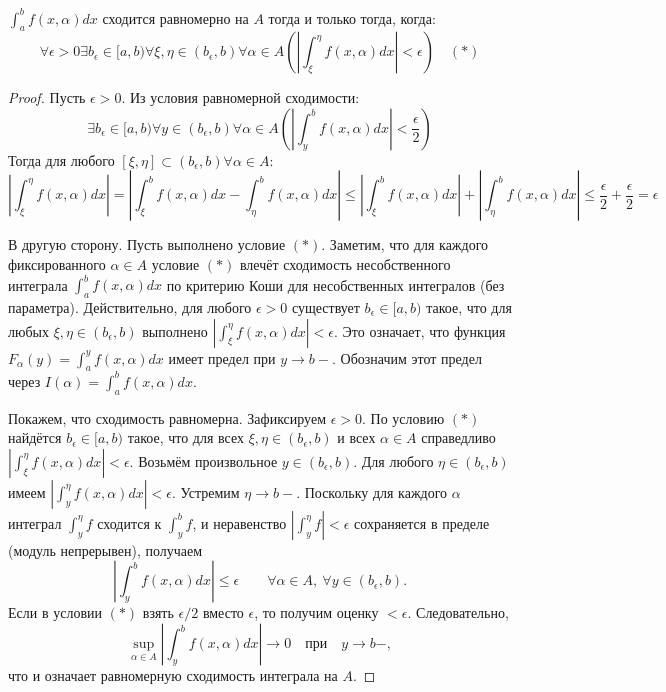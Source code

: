 \begin{theorem}
    \(\int_a^b f(x, \alpha)dx\) сходится равномерно на \(A\) тогда и только тогда, когда:
    \[\forall \epsilon > 0 \exists b_{\epsilon} \in [a, b) \forall \xi, \eta \in (b_\epsilon, b) \forall \alpha \in A \left( \left| \int_\xi^\eta f(x, \alpha) dx \right| < \epsilon \right)\quad(*)\]
\end{theorem}
\begin{proof}
    Пусть \(\epsilon > 0\). Из условия равномерной сходимости:
    \[\exists b_\epsilon \in [a, b)  \forall y \in (b_\epsilon, b) \forall \alpha \in A \left( \left| \int_y^b f(x, \alpha) dx \right| < \frac{\epsilon}{2} \right)\]
    Тогда для любого \([\xi, \eta] \subset (b_\epsilon, b) \forall \alpha \in A\):
    \[\left| \int_\xi^\eta f(x, \alpha) dx \right| = \left| \int_\xi^b f(x, \alpha) dx - \int_\eta^b f(x, \alpha) dx \right| \le \left| \int_\xi^b f(x, \alpha) dx \right| + \left|\int_\eta^b f(x, \alpha) dx \right| \le \frac{\epsilon}{2} + \frac{\epsilon}{2} = \epsilon\]

    В другую сторону. Пусть выполнено условие \((*)\). Заметим, что для каждого фиксированного \(\alpha \in A\) условие \((*)\) влечёт сходимость несобственного интеграла \(\int_a^b f(x,\alpha)dx\) по критерию Коши для несобственных интегралов (без параметра). Действительно, для любого \(\epsilon>0\) существует \(b_\epsilon\in[a,b)\) такое, что для любых \(\xi,\eta\in(b_\epsilon,b)\) выполнено \(\left|\int_\xi^\eta f(x,\alpha)dx\right|<\epsilon\). Это означает, что функция \(F_\alpha(y)=\int_a^y f(x,\alpha)dx\) имеет предел при \(y\to b-\). Обозначим этот предел через \(I(\alpha)=\int_a^b f(x,\alpha)dx\).

    Покажем, что сходимость равномерна. Зафиксируем \(\epsilon>0\). По условию \((*)\) найдётся \(b_\epsilon\in[a,b)\) такое, что для всех \(\xi,\eta\in(b_\epsilon,b)\) и всех \(\alpha\in A\) справедливо \(\left|\int_\xi^\eta f(x,\alpha)dx\right|<\epsilon\). Возьмём произвольное \(y\in(b_\epsilon,b)\). Для любого \(\eta\in(b_\epsilon,b)\) имеем \(\left|\int_y^\eta f(x,\alpha)dx\right|<\epsilon\). Устремим \(\eta\to b-\). Поскольку для каждого \(\alpha\) интеграл \(\int_y^\eta f\) сходится к \(\int_y^b f\), и неравенство \(\left|\int_y^\eta f\right|<\epsilon\) сохраняется в пределе (модуль непрерывен), получаем
    \[
    \left|\int_y^b f(x,\alpha)dx\right| \le \epsilon \qquad \forall \alpha\in A,\ \forall y\in(b_\epsilon,b).
    \]
    Если в условии \((*)\) взять \(\epsilon/2\) вместо \(\epsilon\), то получим оценку \(<\epsilon\). Следовательно,
    \[
    \sup_{\alpha\in A}\left|\int_y^b f(x,\alpha)dx\right| \to 0 \quad\text{при}\quad y\to b-,
    \]
    что и означает равномерную сходимость интеграла на \(A\).
\end{proof}

